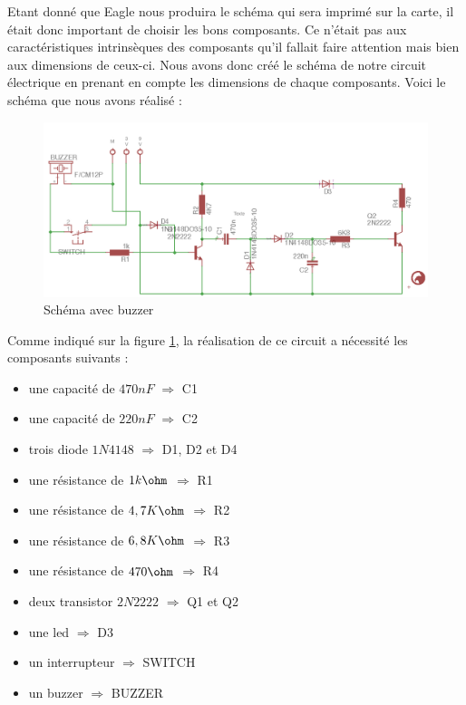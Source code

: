 Etant donné que Eagle nous produira le schéma qui sera imprimé sur la carte, il était donc important de choisir les bons composants. Ce n'était pas aux caractéristiques intrinsèques des composants qu'il fallait faire attention mais bien aux dimensions de ceux-ci. Nous avons donc créé le schéma de notre circuit électrique en prenant en compte les dimensions de chaque composants. Voici le schéma que nous avons réalisé : 


\begin{figure}[H]
\centering
\includegraphics[width=1\textwidth]{ressources/schema_final}
\caption{Schéma avec buzzer}
\label{schemaEagle}
\end{figure}

Comme indiqué sur la figure \ref{schemaEagle}, la réalisation de ce circuit a nécessité les composants suivants :
\begin{itemize}
	\item une capacité de \textbf{$470 nF$} $\Rightarrow$ C1
	\item une capacité de \textbf{$220 nF$}  $\Rightarrow$ C2
	\item trois diode \textbf{$1N4148$} $\Rightarrow$ D1, D2 et D4
	\item une résistance de \textbf{$ 1k\ohm $} $\Rightarrow$ R1
	\item  une résistance de \textbf{$ 4,7K\ohm $} $\Rightarrow$ R2
	\item  une résistance de \textbf{$ 6,8K\ohm $} $\Rightarrow$ R3
	\item une résistance de \textbf{$470\ohm $} $\Rightarrow$ R4
	\item deux transistor  \textbf{$2N2222 $} $\Rightarrow$ Q1 et Q2
	\item une led $\Rightarrow$ D3
	\item un interrupteur $\Rightarrow$ SWITCH
	\item un buzzer $\Rightarrow$ BUZZER
\end{itemize}



